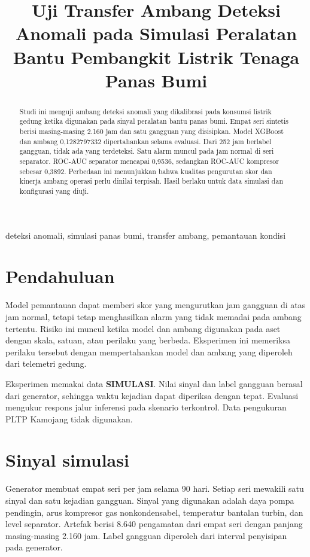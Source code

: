 \documentclass[conference]{IEEEtran}
\begin{document}
\title{Uji Transfer Ambang Deteksi Anomali pada Simulasi Peralatan Bantu Pembangkit Listrik Tenaga Panas Bumi}
\author{}
\maketitle
\begin{abstract}
Studi ini menguji ambang deteksi anomali yang dikalibrasi pada konsumsi listrik gedung ketika digunakan pada sinyal peralatan bantu panas bumi. Empat seri sintetis berisi masing-masing 2.160 jam dan satu gangguan yang disisipkan. Model XGBoost dan ambang 0,1282797332 dipertahankan selama evaluasi. Dari 252 jam berlabel gangguan, tidak ada yang terdeteksi. Satu alarm muncul pada jam normal di seri separator. ROC-AUC separator mencapai 0,9536, sedangkan ROC-AUC kompresor sebesar 0,3892. Perbedaan ini menunjukkan bahwa kualitas pengurutan skor dan kinerja ambang operasi perlu dinilai terpisah. Hasil berlaku untuk data simulasi dan konfigurasi yang diuji.
\end{abstract}
\begin{IEEEkeywords}
deteksi anomali, simulasi panas bumi, transfer ambang, pemantauan kondisi
\end{IEEEkeywords}

\section{Pendahuluan}
Model pemantauan dapat memberi skor yang mengurutkan jam gangguan di atas jam normal, tetapi tetap menghasilkan alarm yang tidak memadai pada ambang tertentu. Risiko ini muncul ketika model dan ambang digunakan pada aset dengan skala, satuan, atau perilaku yang berbeda. Eksperimen ini memeriksa perilaku tersebut dengan mempertahankan model dan ambang yang diperoleh dari telemetri gedung.

Eksperimen memakai data \textbf{SIMULASI}. Nilai sinyal dan label gangguan berasal dari generator, sehingga waktu kejadian dapat diperiksa dengan tepat. Evaluasi mengukur respons jalur inferensi pada skenario terkontrol. Data pengukuran PLTP Kamojang tidak digunakan.

\section{Sinyal simulasi}
Generator membuat empat seri per jam selama 90 hari. Setiap seri mewakili satu sinyal dan satu kejadian gangguan. Sinyal yang digunakan adalah daya pompa pendingin, arus kompresor gas nonkondensabel, temperatur bantalan turbin, dan level separator. Artefak berisi 8.640 pengamatan dari empat seri dengan panjang masing-masing 2.160 jam. Label gangguan diperoleh dari interval penyisipan pada generator.
\end{document}
